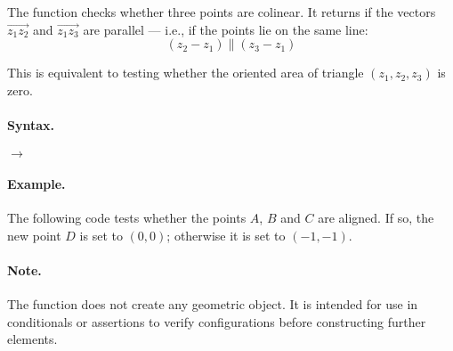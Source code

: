 The function   checks whether three points are colinear. It returns  if the vectors $\overrightarrow{z_1z_2}$ and $\overrightarrow{z_1z_3}$ are parallel — i.e., if the points lie on the same line:
\[
(z_2 - z_1) \parallel (z_3 - z_1)
\]

This is equivalent to testing whether the oriented area of triangle $(z_1, z_2, z_3)$ is zero.

\paragraph{Syntax.}
\begin{center}
 $\rightarrow$ 
\end{center}

\paragraph{Example.}
The following code tests whether the points $A$, $B$ and $C$ are aligned. If so, the new point $D$ is set to $(0, 0)$; otherwise it is set to $(-1, -1)$.

\begin{minipage}{0.48\textwidth}
\begin{tkzexample}
\end{tkzexample}

\begin{tkzexample}
\end{tkzexample}
\end{minipage}
\hfill
\begin{minipage}{0.48\textwidth}
\begin{center}
\end{center}
\end{minipage}

\paragraph{Note.}
The function does not create any geometric object. It is intended for use in conditionals or assertions to verify configurations before constructing further elements.

